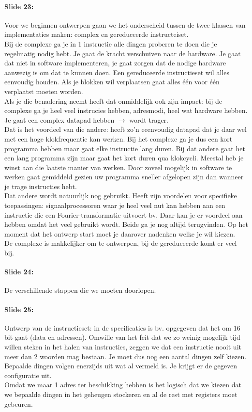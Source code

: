 \documentclass[10pt,a4paper]{book}
\begin{document}
\paragraph{Slide 23:} Voor we beginnen ontwerpen gaan we het onderscheid tussen de twee klassen van implementaties maken: complex en gereduceerde instructeiset.\\
Bij de complexe ga je in 1 instructie alle dingen proberen te doen die je regelmatig nodig hebt. Je gaat de kracht verschuiven naar de hardware. Je gaat dat niet in software implementeren, je gaat zorgen dat de nodige hardware aanwezig is om dat te kunnen doen. Een gereduceerde instructieset wil alles eenvoudig houden. Als je blokken wil verplaatsen gaat alles \'e\'en voor \'e\'en verplaatst moeten worden.\\
Als je die benadering neemt heeft dat onmiddelijk ook zijn impact: bij de complexe ga je heel veel instrucies hebben, adresmodi, heel wat hardware hebben. Je gaat een complex datapad hebben $\rightarrow$ wordt trager.\\
Dat is het voordeel van die andere: heeft zo'n eeenvoudig datapad dat je daar wel met een hoge klokfrequentie kan werken. Bij het complexe ga je dus een kort programma hebben maar gaat elke instructie lang duren. Bij dat andere gaat het een lang programma zijn maar gaat het kort duren qua klokcycli. Meestal heb je winst aan die laatste manier van werken. Door zoveel mogelijk in software te werken gaat gemiddeld gezien uw programma sneller afgelopen zijn dan wanneer je trage instructies hebt.\\
Dat andere wordt natuurlijk nog gebruikt. Heeft zijn voordelen voor specifieke toepassingen: signaalprocessoren waar je heel veel nut kan hebben aan een instructie die een Fourier-transformatie uitvoert bv. Daar kan je er voordeel aan hebben omdat het veel gebruikt wordt. Beide ga je nog altijd terugvinden. Op het moment dat het ontwerp start moet je daarover nadenken welke je wil kiezen.\\
De complexe is makkelijker om te ontwerpen, bij de gereduceerde komt er veel bij. 

\paragraph{Slide 24:} De verschillende stappen die we moeten doorlopen.

\paragraph{Slide 25:} Ontwerp van de instructieset: in de specificaties is bv. opgegeven dat het om 16 bit gaat (data en adressen). Omwille van het feit dat we zo weinig mogelijk tijd willen steken in het halen van instructies, zeggen we dat een instructie nooit uit meer dan 2 woorden mag bestaan. Je moet dus nog een aantal dingen zelf kiezen. Bepaalde dingen volgen enerzijds uit wat al vermeld is. Je krijgt er de gegeven configuratie uit.\\
Omdat we maar 1 adres ter beschikking hebben is het logisch dat we kiezen dat we bepaalde dingen in het geheugen stockeren en al de rest met registers moet gebeuren.
\end{document}
